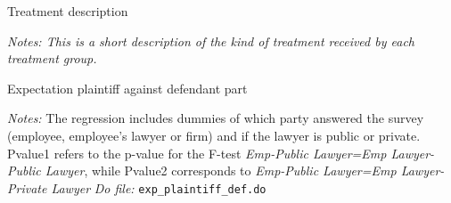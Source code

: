 \documentclass[11pt]{article}
\begin{document}





\begin{table}[H]
   \caption{Treatment description}
    \label{treatment_description}
    \begin{center}
    \scriptsize{}
    \end{center}
    \footnotesize
    \textit{Notes: This is a short description of the kind of treatment received by each treatment group.} 
\end{table}

\begin{landscape}

\begin{table}[H]
\caption{Expectation plaintiff against defendant part}
\label{Table_exp_plaintiff_def}
\begin{center}
\scriptsize{}
\end{center}
 \footnotesize
\textit{Notes:} 
The regression includes dummies of which party answered the survey (employee, employee's lawyer or firm) and if the lawyer is public or private. Pvalue1 refers to the p-value for the F-test \emph{ Emp-Public Lawyer=Emp Lawyer-Public Lawyer}, while Pvalue2 corresponds to \emph{ Emp-Public Lawyer=Emp Lawyer-Private Lawyer}
\textit{Do file: } \texttt{exp\_plaintiff\_def.do}
\end{table}

\end{landscape}
\end{document}
